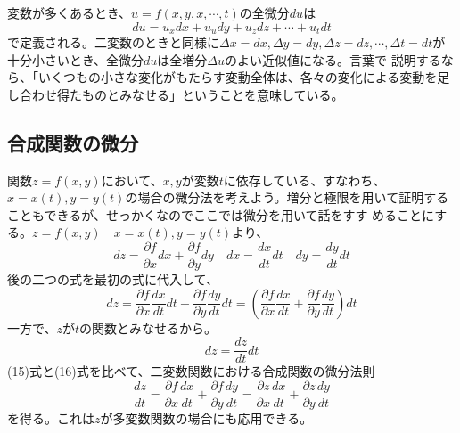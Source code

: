 \documentclass[a4j,dvipdfmx]{jsarticle}
\begin{document}
変数が多くあるとき、$u=f(x,y,x,\cdots,t)$の全微分$du$は
\begin{equation}
    du=u_xdx+u_udy+u_zdz+\cdots+u_tdt
\end{equation}
で定義される。二変数のときと同様に$\Delta x=dx,\Delta y=dy,\Delta z=dz,\cdots,\Delta t=dt$が十分小さいとき、全微分$du$は全増分$\Delta u$のよい近似値になる。言葉で
説明するなら、「いくつもの小さな変化がもたらす変動全体は、各々の変化による変動を足し合わせ得たものとみなせる」ということを意味している。
\subsection{合成関数の微分}
関数$z=f(x,y)$において、$x,y$が変数$t$に依存している、すなわち、$x=x(t),y=y(t)$の場合の微分法を考えよう。増分と極限を用いて証明することもできるが、せっかくなのでここでは微分を用いて話をすす
めることにする。$z=f(x,y)\quad x=x(t),y=y(t)$より、
\begin{equation}
    dz=\frac{\partial f}{\partial x}dx+\frac{\partial f}{\partial y}dy\quad dx=\frac{dx}{dt}dt\quad dy=\frac{dy}{dt}dt
\end{equation}
後の二つの式を最初の式に代入して、
\begin{equation}
    dz=\frac{\partial f}{\partial x}\frac{dx}{dt}dt+\frac{\partial f}{\partial y}\frac{dy}{dt}dt
    =\left(\frac{\partial f}{\partial x}\frac{dx}{dt}+\frac{\partial f}{\partial y}\frac{dy}{dt}\right)dt
\end{equation}
一方で、$z$が$t$の関数とみなせるから。
\begin{equation}
    dz=\frac{dz}{dt}dt
\end{equation}
(15)式と(16)式を比べて、二変数関数における合成関数の微分法則
\begin{equation}
    \frac{dz}{dt}=\frac{\partial f}{\partial x}\frac{dx}{dt}+\frac{\partial f}{\partial y}\frac{dy}{dt}
    =\frac{\partial z}{\partial x}\frac{dx}{dt}+\frac{\partial z}{\partial y}\frac{dy}{dt}
\end{equation}
を得る。これは$z$が多変数関数の場合にも応用できる。
\end{document}
